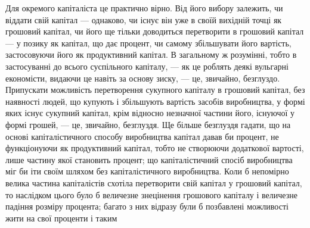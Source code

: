 Для окремого капіталіста це практично вірно. Від його вибору
залежить, чи віддати свій капітал — однаково, чи існує
він уже в своїй вихідній точці як грошовий капітал, чи його
ще тільки доводиться перетворити в грошовий капітал — у позику
як капітал, що дає процент, чи самому збільшувати його
вартість, застосовуючи його як продуктивний капітал. В загальному
ж розумінні, тобто в застосуванні до всього суспільного
капіталу, — як це роблять деякі вульгарні економісти, видаючи
це навіть за основу зиску, — це, звичайно, безглуздо. Припускати
можливість перетворення сукупного капіталу в грошовий капітал,
без наявності людей, що купують і збільшують вартість
засобів виробництва, у формі яких існує сукупний капітал, крім
відносно незначної частини його, існуючої у формі грошей, — це,
звичайно, безглуздя. Ще більше безглуздя гадати, що на основі
капіталістичного способу виробництва капітал давав би процент,
не функціонуючи як продуктивний капітал, тобто не створюючи
додаткової вартості, лише частину якої становить процент; що
капіталістичний спосіб виробництва міг би іти своїм шляхом без
капіталістичного виробництва. Коли б непомірно велика частина
капіталістів схотіла перетворити свій капітал у грошовий капітал,
то наслідком цього було б величезне знецінення грошового капіталу
і величезне падіння розміру процента; багато з них відразу
були б позбавлені можливості жити на свої проценти і таким
\parbreak{}  %
